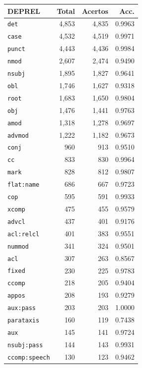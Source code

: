 \begin{table}[ht]
\centering
\footnotesize
\begin{tabular}{lrrr}
\toprule
\textbf{DEPREL} & \textbf{Total} & \textbf{Acertos} & \textbf{Acc.} \\
\midrule
\texttt{det} & 4,853 & 4,835 & 0.9963 \\
\texttt{case} & 4,532 & 4,519 & 0.9971 \\
\texttt{punct} & 4,443 & 4,436 & 0.9984 \\
\texttt{nmod} & 2,607 & 2,474 & 0.9490 \\
\texttt{nsubj} & 1,895 & 1,827 & 0.9641 \\
\texttt{obl} & 1,746 & 1,627 & 0.9318 \\
\texttt{root} & 1,683 & 1,650 & 0.9804 \\
\texttt{obj} & 1,476 & 1,441 & 0.9763 \\
\texttt{amod} & 1,318 & 1,278 & 0.9697 \\
\texttt{advmod} & 1,222 & 1,182 & 0.9673 \\
\texttt{conj} & 960 & 913 & 0.9510 \\
\texttt{cc} & 833 & 830 & 0.9964 \\
\texttt{mark} & 828 & 812 & 0.9807 \\
\texttt{flat\!:\!name} & 686 & 667 & 0.9723 \\
\texttt{cop} & 595 & 591 & 0.9933 \\
\texttt{xcomp} & 475 & 455 & 0.9579 \\
\texttt{advcl} & 437 & 401 & 0.9176 \\
\texttt{acl\!:\!relcl} & 401 & 383 & 0.9551 \\
\texttt{nummod} & 341 & 324 & 0.9501 \\
\texttt{acl} & 307 & 263 & 0.8567 \\
\texttt{fixed} & 230 & 225 & 0.9783 \\
\texttt{ccomp} & 218 & 205 & 0.9404 \\
\texttt{appos} & 208 & 193 & 0.9279 \\
\texttt{aux\!:\!pass} & 203 & 203 & 1.0000 \\
\texttt{parataxis} & 160 & 119 & 0.7438 \\
\texttt{aux} & 145 & 141 & 0.9724 \\
\texttt{nsubj\!:\!pass} & 144 & 143 & 0.9931 \\
\texttt{ccomp\!:\!speech} & 130 & 123 & 0.9462 \\

\end{tabular}
\end{table}
